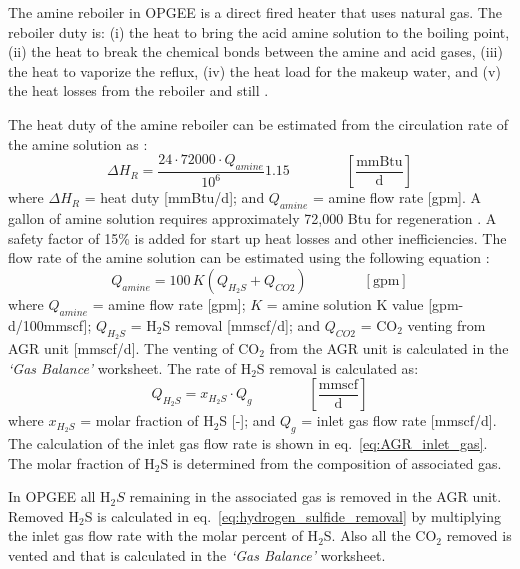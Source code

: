 \documentclass[11pt]{report}
\newcommand{\sheet}[1]{\textit{`{#1}'}}
\newcommand{\eqnunit}[1]{\quad\quad \scriptstyle{\left[\text{#1}\right]}}
\newcommand{\eqnunitfrac}[2]{\quad\quad \scriptstyle{\left[\frac{\text{#1}}{\text{#2}}\right]}}
\begin{document}
The amine reboiler in OPGEE is a direct fired heater that uses natural gas. The reboiler duty is: (i) the heat to bring the acid amine solution to the boiling point, (ii) the heat to break the chemical bonds between the amine and acid gases, (iii) the heat to vaporize the reflux, (iv) the heat load for the makeup water, and (v) the heat losses from the reboiler and still \cite[p. 117]{Manning1991}.


The heat duty of the amine reboiler can be estimated from the circulation rate of the amine solution as \cite[p. 119---originally Jones and Perry, 1973]{Manning1991}:  
\begin{equation} \label{eq:gas_AGR_heat}
\Delta H_{R}= \frac{24\cdot72000 \cdot Q_{amine}}{10^6}  1.15 \quad\quad\eqnunitfrac{mmBtu}{d}
\end{equation}
where $\Delta H_{R}$ = heat duty [mmBtu/d]; and $Q_{amine}$ = amine flow rate [gpm].   A gallon of amine solution requires approximately 72,000 Btu for regeneration \cite{Jones1973}. A safety factor of 15\% is added for start up heat losses and other inefficiencies. The flow rate of the amine solution can be estimated using the following equation \cite[p. 115]{Manning1991}:  
\begin{equation} \label{eq:amine_flow_rate}
Q_{amine}=100\,K (Q_{ H_{2}S}+  Q_{CO2}) \quad\quad\eqnunit{gpm}
\end{equation}
where $Q_{amine}$ = amine flow rate [gpm]; $K$ = amine solution K value [gpm-d/100mmscf]; $Q_{H_{2}S}$ = H$_{2}$S removal [mmscf/d]; and $Q_{CO2}$ = CO$_{2}$ venting from AGR unit [mmscf/d]. The venting of CO$_{2}$ from the AGR unit is calculated in the \sheet{Gas Balance} worksheet. The rate of H$_{2}$S removal is calculated as:
\begin{equation} \label{eq:hydrogen_sulfide_removal}
Q_{ H_{2}S} = x_{H_{2}S}\cdot Q_{g} \quad\quad\eqnunitfrac{mmscf}{d}
\end{equation}
where $x_{H_{2}S}$ = molar fraction of H$_{2}$S [-]; and $Q_{g}$ = inlet gas flow rate [mmscf/d]. The calculation of the inlet gas flow rate is shown in eq.\ \eqref{eq:AGR_inlet_gas}. The molar fraction of H$_{2}$S is determined from the composition of associated gas.

In OPGEE all H$_{2}S$ remaining in the associated gas is removed in the AGR unit. Removed H$_2$S is calculated in eq.\ \eqref{eq:hydrogen_sulfide_removal} by multiplying the inlet gas flow rate with the molar percent of H$_{2}$S. Also all the CO$_{2}$ removed is vented and that is calculated in the \sheet{Gas Balance} worksheet.
\end{document}
